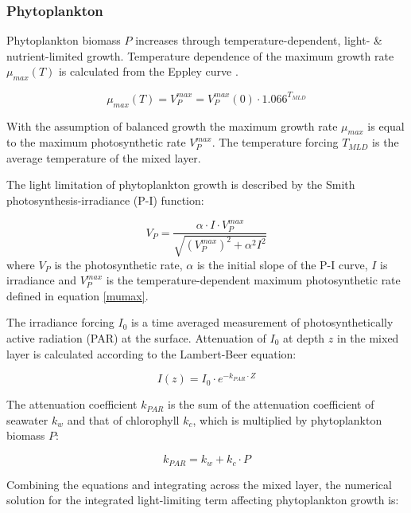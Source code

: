 \documentclass[journal abbreviation, manuscript]{copernicus}
\begin{document}
\subsubsection{Phytoplankton}
Phytoplankton biomass $P$ increases through temperature-dependent, light- \& nutrient-limited growth. Temperature dependence of the maximum growth rate $\mu_{max}(T)$ is calculated from the Eppley curve \citep{Eppley1972TemperatureSea}.

\begin{equation}
    \mu_{max}(T) = V^{max}_P = V^{max}_P(0) \cdot 1.066^{T_{MLD}} \label{mumax}
\end{equation}

With the assumption of balanced growth the maximum growth rate $\mu_{max}$ is equal to the maximum photosynthetic rate $V^{max}_P$. The temperature forcing $T_{MLD}$ is the average temperature of the mixed layer.

The light limitation of phytoplankton growth is described by the Smith photosynthesis-irradiance (P-I) function:

\begin{equation}
    V_P = \frac{\alpha \cdot I \cdot V^{max}_P}{\sqrt{(V^{max}_P)^2 + \alpha^2 I^2}}
\end{equation}
where $V_P$ is the photosynthetic rate, $\alpha$ is the initial slope of the P-I curve, $I$ is irradiance and $V^{max}_P$ is the temperature-dependent maximum photosynthetic rate defined in equation \eqref{mumax}.


The irradiance forcing $I_0$ is a time averaged measurement of photosynthetically active radiation (PAR) at the surface. Attenuation of $I_0$ at depth $z$ in the mixed layer is calculated according to the Lambert-Beer equation:

\begin{equation}
    I(z) = I_0 \cdot e^{-k_{PAR} \cdot Z} \label{beer}
\end{equation}

The attenuation coefficient $k_{PAR}$ is the sum of the attenuation coefficient of seawater $k_w$ and that of chlorophyll $k_c$, which is multiplied by phytoplankton biomass $P$:

\begin{equation}
    k_{PAR} = k_w + k_c \cdot P
\end{equation}

Combining the equations and integrating across the mixed layer, the numerical solution for the integrated light-limiting term affecting phytoplankton growth is:
\end{document}
